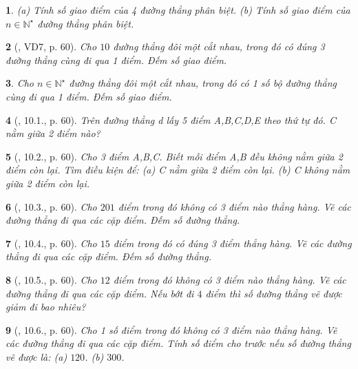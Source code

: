 \documentclass{article}
\newtheorem{baitoan}{}
\begin{document}
\begin{baitoan}
	(a) Tính số giao điểm của 4 đường thẳng phân biệt. (b) Tính số giao điểm của $n\in\mathbb{N}^\star$ đường thẳng phân biệt.
\end{baitoan}

\begin{baitoan}[\cite{Binh_boi_duong_Toan_6_tap_2}, VD7, p. 60]
	Cho $10$ đường thẳng đôi một cắt nhau, trong đó có đúng 3 đường thẳng cùng đi qua 1 điểm. Đếm số giao điểm.
\end{baitoan}

\begin{baitoan}
	Cho $n\in\mathbb{N}^\star$ đường thẳng đôi một cắt nhau, trong đó có 1 số bộ đường thẳng cùng đi qua 1 điểm. Đếm số giao điểm.
\end{baitoan}

\begin{baitoan}[\cite{Binh_boi_duong_Toan_6_tap_2}, 10.1., p. 60]
	Trên đường thẳng d lấy 5 điểm A,B,C,D,E theo thứ tự đó. C nằm giữa 2 điểm nào?
\end{baitoan}

\begin{baitoan}[\cite{Binh_boi_duong_Toan_6_tap_2}, 10.2., p. 60]
	Cho 3 điểm A,B,C. Biết mỗi điểm A,B đều không nằm giữa 2 điểm còn lại. Tìm điều kiện để: (a) C nằm giữa 2 điểm còn lại. (b) C không nằm giữa 2 điểm còn lại.
\end{baitoan}

\begin{baitoan}[\cite{Binh_boi_duong_Toan_6_tap_2}, 10.3., p. 60]
	Cho $201$ điểm trong đó không có 3 điểm nào thẳng hàng. Vẽ các đường thẳng đi qua các cặp điểm. Đếm số đường thẳng.
\end{baitoan}

\begin{baitoan}[\cite{Binh_boi_duong_Toan_6_tap_2}, 10.4., p. 60]
	Cho $15$ điểm trong đó có đúng 3 điểm thẳng hàng. Vẽ các đường thẳng đi qua các cặp điểm. Đếm số đường thẳng.
\end{baitoan}

\begin{baitoan}[\cite{Binh_boi_duong_Toan_6_tap_2}, 10.5., p. 60]
	Cho $12$ điểm trong đó không có 3 điểm nào thẳng hàng. Vẽ các đường thẳng đi qua các cặp điểm. Nếu bớt đi $4$ điểm thì số đường thẳng vẽ được giảm đi bao nhiêu?
\end{baitoan}

\begin{baitoan}[\cite{Binh_boi_duong_Toan_6_tap_2}, 10.6., p. 60]
	Cho 1 số điểm trong đó không có 3 điểm nào thẳng hàng. Vẽ các đường thẳng đi qua các cặp điểm. Tính số điểm cho trước nếu số đường thẳng vẽ được là: (a) $120$. (b) $300$.
\end{baitoan}
\end{document}
